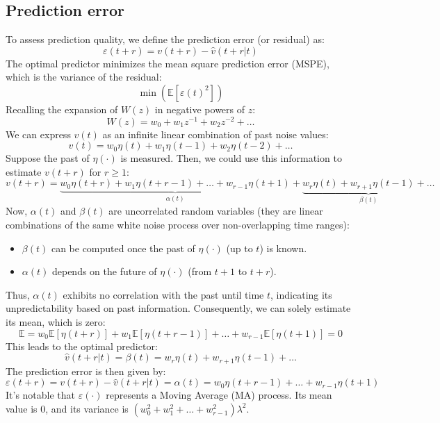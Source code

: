 \subsection{Prediction error}
To assess prediction quality, we define the prediction error (or residual) as:
\[\varepsilon(t+r)=v(t+r)-\hat{v}(t+r|t)\]
The optimal predictor minimizes the mean square prediction error (MSPE), which is the variance of the residual:
\[\min\left( \mathbb{E}\left[\varepsilon(t)^2 \right] \right)\]
Recalling the expansion of $W(z)$ in negative powers of $z$: 
\[W(z)=w_0+w_1z^{-1}+w_2z^{-2}+\dots\]
We can express $v(t)$ as an infinite linear combination of past noise values:
\[v(t)=w_0\eta(t)+w_1\eta(t-1)+w_2\eta(t-2)+\dots\]
Suppose the past of $\eta(\cdot)$ is measured. 
Then, we could use this information to estimate $v(t+r)$ for $r \geq 1$: 
\[v(t+r)=\underbrace{w_0\eta(t+r)+w_1\eta(t+r-1)+\dots+w_{r-1}\eta(t+1)}_{\alpha(t)} +\underbrace{w_r\eta(t)+w_{r+1}\eta(t-1)+\dots}_{\beta(t)} \]
Now, $\alpha(t)$ and $\beta(t)$ are uncorrelated random variables (they are linear combinations of the same white noise process over non-overlapping time ranges):
\begin{itemize}
    \item $\beta(t)$ can be computed once the past of $\eta(\cdot)$ (up to $t$) is known. 
    \item $\alpha(t)$ depends on the future of $\eta(\cdot)$ (from $t+1$ to $t+r$). 
\end{itemize}
Thus, $\alpha(t)$ exhibits no correlation with the past until time $t$, indicating its unpredictability based on past information. 
Consequently, we can solely estimate its mean, which is zero:
\[\mathbb{E}=w_0\mathbb{E}\left[\eta(t+r)\right]+w_1\mathbb{E}\left[\eta(t+r-1)\right]+\dots+w_{r-1}\mathbb{E}\left[\eta(t+1)\right]=0\]
This leads to the optimal predictor:
\[\hat{v}(t+r|t)=\beta(t)=w_r\eta(t)+w_{r+1}\eta(t-1)+\dots\]
The prediction error is then given by:
\[\varepsilon(t+r)=v(t+r)-\hat{v}(t+r|t)=\alpha(t)=w_0\eta(t+r-1)+\dots+w_{r-1}\eta(t+1)\]
It's notable that $\varepsilon(\cdot)$ represents a Moving Average (MA) process. 
Its mean value is 0, and its variance is $(w_0^2 + w_1^2 + \dots + w_{r-1}^2)\lambda^2$.

